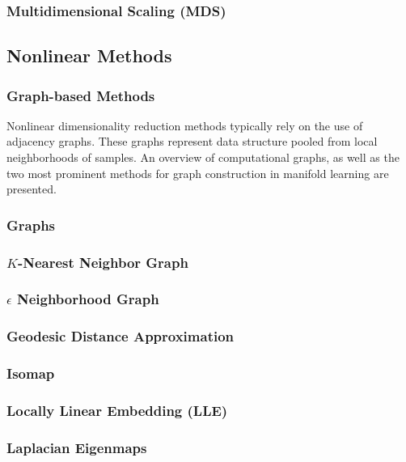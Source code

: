 \subsubsection{Multidimensional Scaling (MDS)}

\subsection{Nonlinear Methods}

\subsubsection{Graph-based Methods}
Nonlinear dimensionality reduction methods typically rely on the use of adjacency graphs.  These graphs represent data structure pooled from local neighborhoods of samples.  An overview of computational graphs, as well as the two most prominent methods for graph construction in manifold learning are presented.

\subsubsection{Graphs}

\subsubsection{$K$-Nearest Neighbor Graph}

\subsubsection{$\epsilon$ Neighborhood Graph}

\subsubsection{Geodesic Distance Approximation}

\subsubsection{Isomap}

\subsubsection{Locally Linear Embedding (LLE)}

\subsubsection{Laplacian Eigenmaps}

